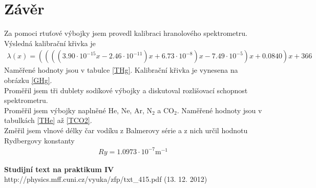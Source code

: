\documentclass[a4paper,12pt]{article}
\begin{document}
\section{Závěr}
Za pomoci rtuťové výbojky jsem provedl kalibraci hranolového spektrometru. Výsledná kalibrační křivka je
\begin{eqnarray}
\lambda(x)=((((3.90\cdot 10^{-15}x-2.46\cdot 10^{-11})x+ 6.73\cdot 10^{-8})x-7.49\cdot 10^{-5})x+0.0840)x+366
\end{eqnarray}
Naměřené hodnoty jsou v tabulce \ref{THg}. Kalibrační křivka je vynesena na obrázku \ref{GHg}.\\
Proměřil jsem tři dublety sodíkové výbojky a diskutoval rozlišovací schopnost spektrometru. \\
Proměřil jsem výbojky naplněné He, Ne, Ar, N$_2$ a CO$_2$. Naměřené hodnoty jsou v tabulkách \ref{THe} až \ref{TCO2}.\\
Změřil jsem vlnové délky čar vodíku z Balmerovy série a z nich určil hodnotu Rydbergovy konstanty
\begin{eqnarray}
Ry=1.0973 \cdot 10^{-7}   \mbox{m}^{-1}
\end{eqnarray} 




\begin{thebibliography}{5}
	 \textbf{Studijní text na praktikum IV} \\http://physics.mff.cuni.cz/vyuka/zfp/txt\_415.pdf (13. 12. 2012)
\end{thebibliography}
\end{document}
